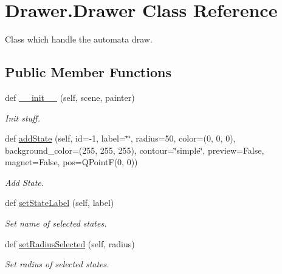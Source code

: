 \hypertarget{classDrawer_1_1Drawer}{}\section{Drawer.\+Drawer Class Reference}
\label{classDrawer_1_1Drawer}


Class which handle the automata draw.  


\subsection*{Public Member Functions}
\begin{DoxyCompactItemize}
\item 
\mbox{\label{classDrawer_1_1Drawer_a8460749dc8e1ede0ed7afbcb09dbfacc}} 
def \mbox{\hyperlink{classDrawer_1_1Drawer_a8460749dc8e1ede0ed7afbcb09dbfacc}{\+\_\+\+\_\+init\+\_\+\+\_\+}} (self, scene, painter)
\begin{DoxyCompactList}\small\item\em Init stuff. \end{DoxyCompactList}\item 
def \mbox{\hyperlink{classDrawer_1_1Drawer_a1597f1f673efc6adef4ccffa4680f41e}{add\+State}} (self, id=-\/1, label=\char`\"{}\char`\"{}, radius=50, color=(0, 0, 0), background\+\_\+color=(255, 255, 255), contour=\char`\"{}simple\char`\"{}, preview=False, magnet=False, pos=Q\+PointF(0, 0))
\begin{DoxyCompactList}\small\item\em Add State. \end{DoxyCompactList}\item 
def \mbox{\hyperlink{classDrawer_1_1Drawer_ad77bf08e11c3d86b7bdd8bc49cfbb0f5}{set\+State\+Label}} (self, label)
\begin{DoxyCompactList}\small\item\em Set name of selected states. \end{DoxyCompactList}\item 
def \mbox{\hyperlink{classDrawer_1_1Drawer_a3863b8beea85d01ebc90f997f41d846c}{set\+Radius\+Selected}} (self, radius)
\begin{DoxyCompactList}\small\item\em Set radius of selected states. \end{DoxyCompactList}\item 
\mbox{\label{classDrawer_1_1Drawer_ab13fe2ceacf1711302f8eb5c36128ce9}} 

\end{DoxyCompactItemize}
